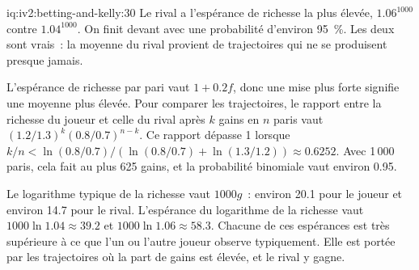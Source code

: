 \begin{solution}{iq:iv2:betting-and-kelly:30}
Le rival a l'espérance de richesse la plus élevée, $1.06^{1000}$ contre $1.04^{1000}$. On finit devant avec une probabilité d'environ 95~\%. Les deux sont vrais~: la moyenne du rival provient de trajectoires qui ne se produisent presque jamais.

L'espérance de richesse par pari vaut $1 + 0.2f$, donc une mise plus forte signifie une moyenne plus élevée. Pour comparer les trajectoires, le rapport entre la richesse du joueur et celle du rival après $k$ gains en $n$ paris vaut $(1.2/1.3)^k(0.8/0.7)^{n - k}$. Ce rapport dépasse 1 lorsque $k/n < \ln(0.8/0.7)/\left(\ln(0.8/0.7) + \ln(1.3/1.2)\right) \approx 0.6252$. Avec 1\,000 paris, cela fait au plus 625 gains, et la probabilité binomiale vaut environ 0.95.

Le logarithme typique de la richesse vaut $1000g$~: environ 20.1 pour le joueur et environ 14.7 pour le rival. L'espérance du logarithme de la richesse vaut $1000\ln 1.04 \approx 39.2$ et $1000\ln 1.06 \approx 58.3$. Chacune de ces espérances est très supérieure à ce que l'un ou l'autre joueur observe typiquement. Elle est portée par les trajectoires où la part de gains est élevée, et le rival y gagne.

\end{solution}

